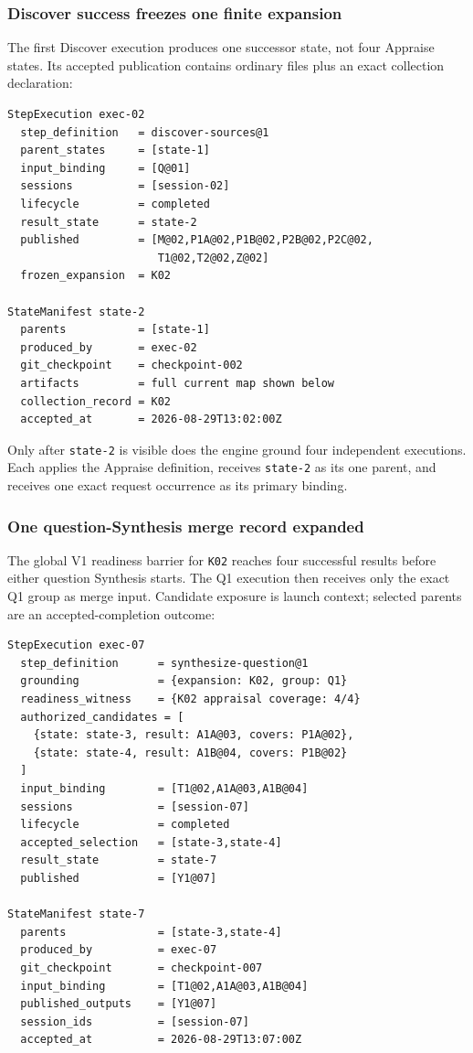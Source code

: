 \documentclass[11pt]{article}
\begin{document}
\subsubsection{Discover success freezes one finite expansion}

The first Discover execution produces one successor state, not four Appraise
states. Its accepted publication contains ordinary files plus an exact
collection declaration:

\begin{lstlisting}[style=playbook,basicstyle=\ttfamily\scriptsize]
StepExecution exec-02
  step_definition   = discover-sources@1
  parent_states     = [state-1]
  input_binding     = [Q@01]
  sessions          = [session-02]
  lifecycle         = completed
  result_state      = state-2
  published         = [M@02,P1A@02,P1B@02,P2B@02,P2C@02,
                       T1@02,T2@02,Z@02]
  frozen_expansion  = K02

StateManifest state-2
  parents           = [state-1]
  produced_by       = exec-02
  git_checkpoint    = checkpoint-002
  artifacts         = full current map shown below
  collection_record = K02
  accepted_at       = 2026-08-29T13:02:00Z
\end{lstlisting}

Only after \texttt{state-2} is visible does the engine ground four independent
executions. Each applies the Appraise definition, receives \texttt{state-2} as
its one parent, and receives one exact request occurrence as its primary
binding.

\subsubsection{One question-Synthesis merge record expanded}

The global V1 readiness barrier for \texttt{K02} reaches four successful
results before either question Synthesis starts. The Q1 execution then receives
only the exact Q1 group as merge input. Candidate exposure is launch context;
selected parents are an accepted-completion outcome:

\begin{lstlisting}[style=playbook,basicstyle=\ttfamily\scriptsize]
StepExecution exec-07
  step_definition      = synthesize-question@1
  grounding            = {expansion: K02, group: Q1}
  readiness_witness    = {K02 appraisal coverage: 4/4}
  authorized_candidates = [
    {state: state-3, result: A1A@03, covers: P1A@02},
    {state: state-4, result: A1B@04, covers: P1B@02}
  ]
  input_binding        = [T1@02,A1A@03,A1B@04]
  sessions             = [session-07]
  lifecycle            = completed
  accepted_selection   = [state-3,state-4]
  result_state         = state-7
  published            = [Y1@07]

StateManifest state-7
  parents              = [state-3,state-4]
  produced_by          = exec-07
  git_checkpoint       = checkpoint-007
  input_binding        = [T1@02,A1A@03,A1B@04]
  published_outputs    = [Y1@07]
  session_ids          = [session-07]
  accepted_at          = 2026-08-29T13:07:00Z
\end{lstlisting}
\end{document}
